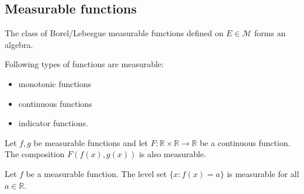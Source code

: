 \subsection{Measurable functions}


    \begin{property}
        The class of Borel/Lebesgue measurable functions defined on $E\in\mathcal{M}$ forms an algebra.
    \end{property}

    \begin{example}
        Following types of functions are measurable:
        \begin{itemize}
            \item monotonic functions
            \item continuous functions
            \item indicator functions.
        \end{itemize}
    \end{example}
    \begin{result}
        Let $f,g$ be measurable functions and let $F:\mathbb{R}\times\mathbb{R}\rightarrow\mathbb{R}$ be a continuous function. The composition $F(f(x), g(x))$ is also measurable.
    \end{result}

    \begin{property}
        Let $f$ be a measurable function. The level set $\{x:f(x) = a\}$ is measurable for all $a\in\mathbb{R}$.
    \end{property}

